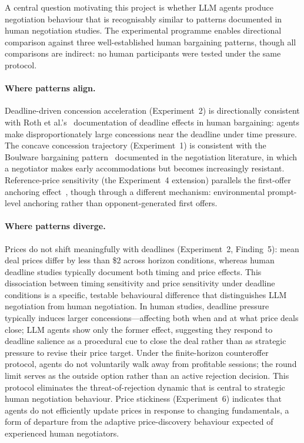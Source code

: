 A central question motivating this project is whether LLM agents produce negotiation behaviour that is recognisably similar to patterns documented in human negotiation studies.  The experimental programme enables directional comparison against three well-established human bargaining patterns, though all comparisons are indirect: no human participants were tested under the same protocol.

\paragraph{Where patterns align.}
Deadline-driven concession acceleration (Experiment~2) is directionally consistent with Roth et al.'s~\cite{roth1988deadline} documentation of deadline effects in human bargaining: agents make disproportionately large concessions near the deadline under time pressure.  The concave concession trajectory (Experiment~1) is consistent with the Boulware bargaining pattern~\cite{raiffa1982} documented in the negotiation literature, in which a negotiator makes early accommodations but becomes increasingly resistant.  Reference-price sensitivity (the Experiment~4 extension) parallels the first-offer anchoring effect~\cite{galinsky2001}, though through a different mechanism: environmental prompt-level anchoring rather than opponent-generated first offers.

\paragraph{Where patterns diverge.}
Prices do not shift meaningfully with deadlines (Experiment~2, Finding~5): mean deal prices differ by less than \$2 across horizon conditions, whereas human deadline studies typically document both timing and price effects.  This dissociation between timing sensitivity and price sensitivity under deadline conditions is a specific, testable behavioural difference that distinguishes LLM negotiation from human negotiation.  In human studies, deadline pressure typically induces larger concessions---affecting both when and at what price deals close; LLM agents show only the former effect, suggesting they respond to deadline salience as a procedural cue to close the deal rather than as strategic pressure to revise their price target.  Under the finite-horizon counteroffer protocol, agents do not voluntarily walk away from profitable sessions; the round limit serves as the outside option rather than an active rejection decision.  This protocol eliminates the threat-of-rejection dynamic that is central to strategic human negotiation behaviour.  Price stickiness (Experiment~6) indicates that agents do not efficiently update prices in response to changing fundamentals, a form of departure from the adaptive price-discovery behaviour expected of experienced human negotiators.

